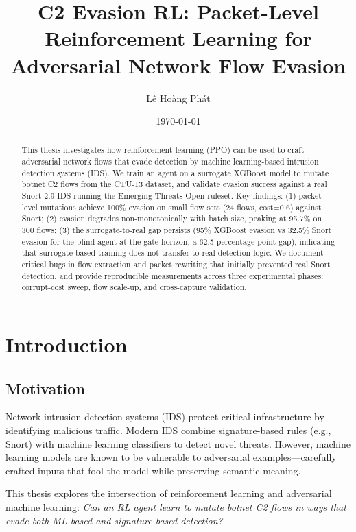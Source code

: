 \documentclass[12pt,a4paper]{report}
\title{C2 Evasion RL: Packet-Level Reinforcement Learning for Adversarial Network Flow Evasion}
\author{Lê Hoàng Phát}
\date{\today}
\begin{document}
\maketitle

\begin{abstract}
This thesis investigates how reinforcement learning (PPO) can be used to craft adversarial network flows that evade detection by machine learning-based intrusion detection systems (IDS). We train an agent on a surrogate XGBoost model to mutate botnet C2 flows from the CTU-13 dataset, and validate evasion success against a real Snort 2.9 IDS running the Emerging Threats Open ruleset. Key findings: (1) packet-level mutations achieve 100\% evasion on small flow sets (24 flows, cost=0.6) against Snort; (2) evasion degrades non-monotonically with batch size, peaking at 95.7\% on 300 flows; (3) the surrogate-to-real gap persists (95\% XGBoost evasion vs 32.5\% Snort evasion for the blind agent at the gate horizon, a 62.5 percentage point gap), indicating that surrogate-based training does not transfer to real detection logic. We document critical bugs in flow extraction and packet rewriting that initially prevented real Snort detection, and provide reproducible measurements across three experimental phases: corrupt-cost sweep, flow scale-up, and cross-capture validation.
\end{abstract}

\tableofcontents

\chapter{Introduction}

\section{Motivation}

Network intrusion detection systems (IDS) protect critical infrastructure by identifying malicious traffic. Modern IDS combine signature-based rules (e.g., Snort) with machine learning classifiers to detect novel threats. However, machine learning models are known to be vulnerable to adversarial examples—carefully crafted inputs that fool the model while preserving semantic meaning.

This thesis explores the intersection of reinforcement learning and adversarial machine learning: \textit{Can an RL agent learn to mutate botnet C2 flows in ways that evade both ML-based and signature-based detection?}
\end{document}
